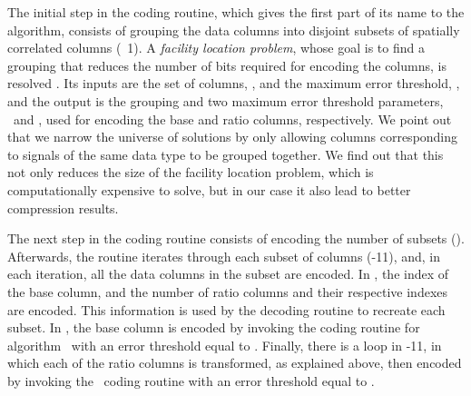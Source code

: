 \vspace{-5pt}



\clearpage


The initial step in the coding routine, which gives the first part of its name to the algorithm, consists of grouping the data columns into disjoint subsets of spatially correlated columns (\Line~1). A \textit{facility location problem}, whose goal is to find a grouping that reduces the number of bits required for encoding the columns, is resolved \cite{coder:gamps}. Its inputs are the set of columns, \columns, and the maximum error threshold, \maxerror, and the output is the grouping and two maximum error threshold parameters, \epsilonB\ and \epsilonR, used for encoding the base and ratio columns, respectively. We point out that we narrow the universe of solutions by only allowing columns corresponding to signals of the same data type to be grouped together. We find out that this not only reduces the size of the facility location problem, which is computationally expensive to solve, but in our case it also lead to better compression results. 


The next step in the coding routine consists of encoding the number of subsets (). Afterwards, the routine iterates through each subset of columns (-11), and, in each iteration, all the data columns in the subset are encoded. In , the index of the base column, and the number of ratio columns and their respective indexes are encoded. This information is used by the decoding routine to recreate each subset. In , the base column is encoded by invoking the coding routine for algorithm \apcaF\ with an error threshold equal to \epsilonB. Finally, there is a loop in -11, in which each of the ratio columns is transformed, as explained above, then encoded by invoking the \apcaF\ coding routine with an error threshold equal to \epsilonR.




